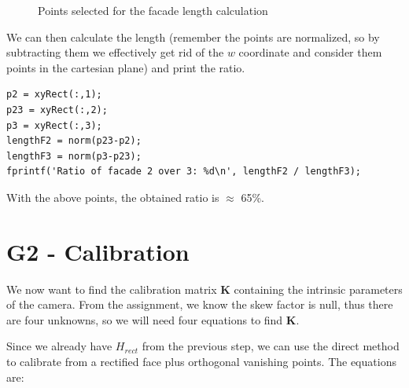 \documentclass{Configuration_Files/PoliMi3i_thesis}
\begin{document}
\begin{figure}[H]
    \centering
    \quad
    \caption{Points selected for the facade length calculation}
    \label{fig:g1_ratio_points}
\end{figure}

We can then calculate the length (remember the points are normalized, so by subtracting them we effectively get rid of the $w$ coordinate and consider them points in the cartesian plane) and print the ratio.

\begin{verbatim}
p2 = xyRect(:,1);
p23 = xyRect(:,2);
p3 = xyRect(:,3);
lengthF2 = norm(p23-p2);
lengthF3 = norm(p3-p23);
fprintf('Ratio of facade 2 over 3: %d\n', lengthF2 / lengthF3);
\end{verbatim}

With the above points, the obtained ratio is $\approx$ 65\%.

\chapter{G2 - Calibration}

We now want to find the calibration matrix $\mathbf{K}$ containing the intrinsic parameters of the camera. From the assignment, we know the skew factor is null, thus there are four unknowns, so we will need four equations to find $\mathbf{K}$.

Since we already have $H_{rect}$ from the previous step, we can use the direct method to calibrate from a rectified face plus orthogonal vanishing points. The equations are:
\end{document}
